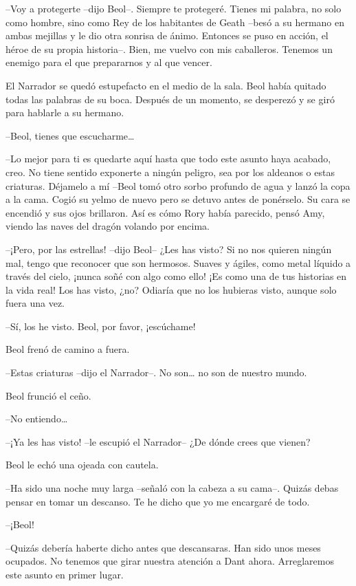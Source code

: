 {--Voy a protegerte --dijo Beol--. Siempre te protegeré. Tienes mi
	palabra, no solo como hombre, sino como Rey de los habitantes de Geath
	--besó a su hermano en ambas mejillas y le dio otra sonrisa de ánimo.
	Entonces se puso en acción, el héroe de su propia historia--. Bien, me
	vuelvo con mis caballeros. Tenemos un enemigo para el que prepararnos y
al que vencer.}

{El Narrador se quedó estupefacto en el medio de la sala. Beol había
	quitado todas las palabras de su boca. Después de un momento, se
desperezó y se giró para hablarle a su hermano.}

{--Beol, tienes que escucharme\ldots{}}

{--Lo mejor para ti es quedarte aquí hasta que todo este asunto haya
	acabado, creo. No tiene sentido exponerte a ningún peligro, sea por los
	aldeanos o estas criaturas. Déjamelo a mí --Beol tomó otro sorbo
	profundo de agua y lanzó la copa a la cama. Cogió su yelmo de nuevo pero
	se detuvo antes de ponérselo. Su cara se encendió y sus ojos brillaron.
	Así es cómo Rory había parecido, pensó Amy, viendo las naves del dragón
volando por encima.}

{--¡Pero, por las estrellas! --dijo Beol-- ¿Les has visto? Si no nos
	quieren ningún mal, tengo que reconocer que son hermosos. Suaves y
	ágiles, como metal líquido a través del cielo, ¡nunca soñé con algo como
	ello! ¡Es como una de tus historias en la vida real! Los has visto, ¿no?
Odiaría que no los hubieras visto, aunque solo fuera una vez.}

{--Sí, los he visto. Beol, por favor, ¡escúchame!}

{Beol frenó de camino a fuera.}

{--Estas criaturas --dijo el Narrador--. No son\ldots{} no son de
nuestro mundo.}

{Beol frunció el ceño.}

{--No entiendo\ldots{}}

{--¡Ya les has visto! --le escupió el Narrador-- ¿De dónde crees que
vienen?}

{Beol le echó una ojeada con cautela.}

{--Ha sido una noche muy larga --señaló con la cabeza a su cama--.
	Quizás debas pensar en tomar un descanso. Te he dicho que yo me
encargaré de todo.}

{--¡Beol!}

{--Quizás debería haberte dicho antes que descansaras. Han sido unos
	meses ocupados. No tenemos que girar nuestra atención a Dant ahora.
Arreglaremos este asunto en primer lugar.}

